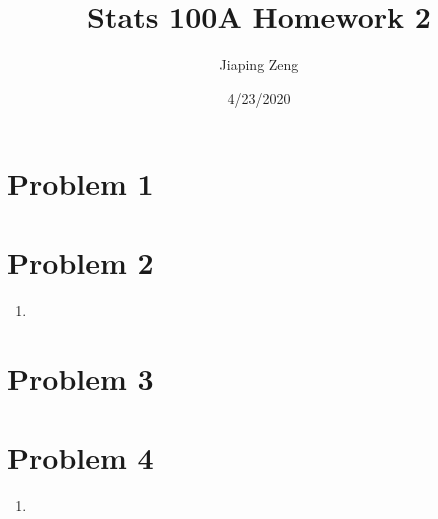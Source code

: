 \documentclass{article}
\title{Stats 100A Homework 2}
\author{Jiaping Zeng}
\date{4/23/2020}
\begin{document}
\maketitle

\section*{Problem 1}

\section*{Problem 2}
\begin{enumerate}
	\item
\end{enumerate}

\section*{Problem 3}

\section*{Problem 4}
\begin{enumerate}
	\item 
\end{enumerate}
\end{document}

